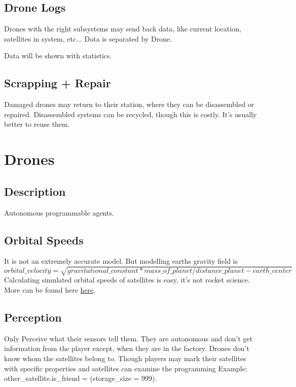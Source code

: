 \documentclass[a4paper]{scrreprt}
\begin{document}
    \section{Drone Logs}
        Drones with the right subsystems may send back data, like current location, satellites in system, etc...
        Data is separated by Drone.
        \begin{alpha}
        Data will be shown with statistics.
        \end{alpha}
    \begin{alpha}
    \section{Scrapping + Repair}
        Damaged drones may return to their station, where they can be disassembled or repaired.
        Disassembled systems can be recycled, though this is costly. It's usually better to reuse them.
    \end{alpha}

\chapter{Drones}
\section{Description}
    Autonomous programmable agents.
\section{Orbital Speeds}
    It is not an extremely accurate model. But modelling earths gravity field is \\
    $orbital\_velocity = \sqrt{gravitational\_constant * mass\_of\_planet / distance\_planet-earth\_center}$\\
    Calculating simulated orbital speeds of satellites is easy, it's not rocket science.
    More can be found here \href{https://www.physicsclassroom.com/class/circles/Lesson-4/Mathematics-of-Satellite-Motion}{here}.
\section{Perception}
    Only Perceive what their sensors tell them.
    They are autonomous and don't get information from the player except, when they are in the factory.
    Drones don't know whom the satellites belong to. Though players may mark their satellites with specific properties and satellites can examine the programming Example: other\_satellite.is\_friend = (storage\_size = 999).
\end{document}
